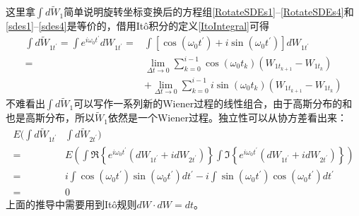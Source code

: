 这里拿$\int d\tilde{W}_1$简单说明旋转坐标变换后的方程组\eqref{RotateSDEs1}--\eqref{RotateSDEs4}和\eqref{sdes1}--\eqref{sdes4}是等价的，借用It\^o积分的定义\eqref{ItoIntegral}可得
\begin{equation}
\begin{aligned}
\int d\tilde{W}_{1t^{\prime}}=\int e^{i\omega_{0}t^{\prime}} d W_{1t^{\prime}} ={}& \int \left[\cos({\omega_{0}t^{\prime}})+i\sin({\omega_{0}t^{\prime}})\right] d W_{1t^{\prime}} \\
={}& \lim\limits_{\Delta t \to 0} \sum_{k=0}^{i-1} \cos({\omega_{0}t_k})\left(W_{1t_{k+1}}-W_{1t_{k}}\right) \\
&+ \lim\limits_{\Delta t \to 0} \sum_{k=0}^{i-1} i\sin({\omega_{0}t_k})\left(W_{1t_{k+1}}-W_{1t_{k}}\right)
\end{aligned}
\end{equation}
不难看出$\int d\tilde{W}_1$可以写作一系列新的Wiener过程的线性组合，由于高斯分布的和也是高斯分布，所以$\tilde{W}_1$依然是一个Wiener过程\ChangeNotation。独立性可以从协方差看出来：
\begin{equation}
\begin{aligned}
E\bigg(\int d \tilde{W}_{1t^{\prime}} &\int d \tilde{W}_{2t^{\prime}}\bigg) \\
={}&E\left(\int \Re\left\{e^{i\omega_{0}t^{\prime}} (d{W}_{1t^{\prime}}+id{W}_{2t^{\prime}})\right\} \int \Im\left\{e^{i\omega_{0}t^{\prime}}(d{W}_{1t^{\prime}}+id{W}_{2t^{\prime}})\right\}\right) \\
={}& i\int \cos({\omega_{0}t^{\prime}})\sin({\omega_{0}t^{\prime}}) d{t^{\prime}} - i\int \sin({\omega_{0}t^{\prime}})\cos({\omega_{0}t^{\prime}}) d{t^{\prime}} \\
={}&0
\end{aligned}
\end{equation}
上面的推导中需要用到It\^o规则$dW \cdot dW=dt$。

